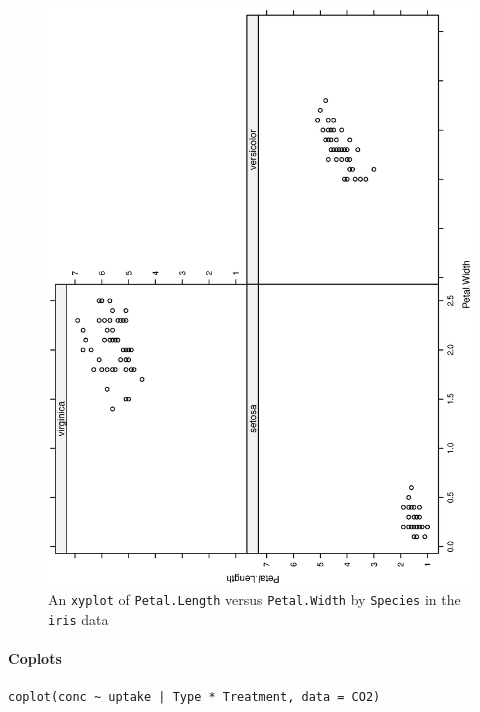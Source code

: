 \documentclass[captions=tableheading]{scrbook}
\begin{document}
\begin{figure}[th]
    \includegraphics[angle=270, totalheight=4in]{img/xyplot.ps}
    \caption[An \texttt{xyplot} of \texttt{Petal.Length} versus \texttt{Petal.Width} by \texttt{Species}]{An \texttt{xyplot} of \texttt{Petal.Length} versus \texttt{Petal.Width} by \texttt{Species} in the \texttt{iris} data}
    \label{fig:xyplot}
  \end{figure}


\paragraph*{Coplots}


\begin{verbatim}
coplot(conc ~ uptake | Type * Treatment, data = CO2)
\end{verbatim}
\end{document}
